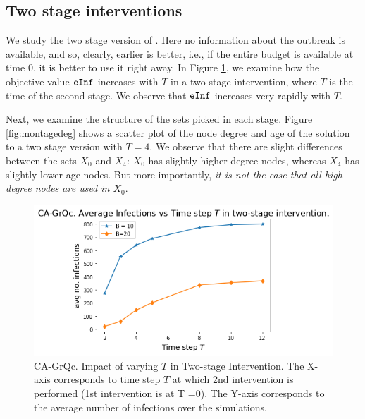  
\subsection{Two stage interventions}
We study the two stage version of \prob{}. Here no information about the outbreak is available, and so, clearly, earlier is better, i.e., if the entire budget is available at time $0$, it is better to use it right away. In Figure \ref{fig:temporal}, we examine how the objective value $\texttt{eInf}{}$ increases with $T$ in a two stage intervention, where $T$ is the time of the second stage. We observe that $\texttt{eInf}{}$ increases very rapidly with $T$.

Next, we examine the structure of the sets picked in each stage. Figure \ref{fig:montagedeg} shows a scatter plot of the node degree and age of the solution to a two stage version with $T=4$. We observe that there are slight differences between the sets $X_0$ and $X_4$: $X_0$ has slightly higher degree nodes, whereas $X_4$ has slightly lower age nodes. But more importantly, \emph{it is not the case that all high degree nodes are used in $X_0$}.

\begin{figure}[!h]
    \centering
    \includegraphics[scale = 0.4]{figures/twostage.png}
    \caption{CA-GrQc. Impact of varying $T$ in Two-stage Intervention. The X-axis corresponds to time step $T$ at which 2nd intervention is performed (1st intervention is at T =0). The Y-axis corresponds to the average number of infections over the simulations.}
    \label{fig:temporal}
\end{figure}

